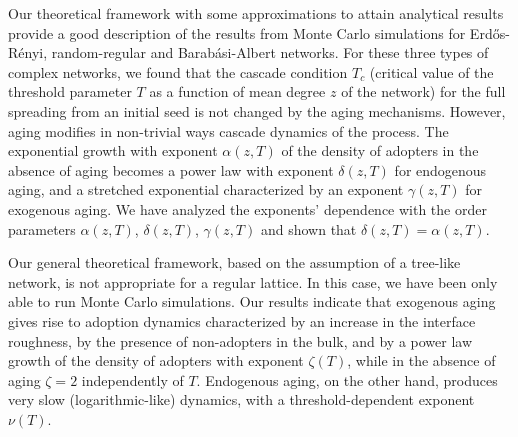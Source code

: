 
Our theoretical framework with some approximations to attain analytical results provide a good description of the results from Monte Carlo simulations for Erd\H{o}s-R\'enyi, random-regular and Barab\'asi-Albert networks. For these three types of complex networks, we found that the cascade condition $T_c$ (critical value of the threshold parameter $T$ as a function of mean degree $z$ of the network) for the full spreading from an initial seed is not changed by the aging mechanisms. However, aging modifies in non-trivial ways cascade dynamics of the process. The exponential growth with exponent $\alpha(z,T)$ of the density of adopters in the absence of aging becomes a power law with exponent $\delta(z,T)$ for endogenous aging, and a stretched exponential characterized by an exponent $\gamma(z,T)$ for exogenous aging. We have analyzed the exponents' dependence with the order parameters $\alpha(z,T)$, $\delta(z,T)$, $\gamma(z,T)$ and shown that $\delta(z,T)=\alpha(z,T)$.

Our general theoretical framework, based on the assumption of a tree-like network, is not appropriate for a regular lattice. In this case, we have been only able to run Monte Carlo simulations. Our results indicate that  exogenous aging gives rise to adoption dynamics characterized by an increase in the interface roughness, by the presence of non-adopters in the bulk, and by a power law growth of  the density of adopters with exponent $\zeta (T)$, while in the absence of aging $\zeta = 2$ independently of $T$. Endogenous aging, on the other hand, produces very slow (logarithmic-like) dynamics, with a threshold-dependent exponent $\nu(T)$.
 

